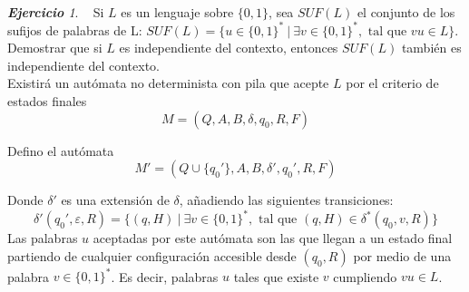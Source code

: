 \documentclass[12pt,spanish]{article}
\theoremstyle{definition}
\theoremstyle{remark}
\newtheorem{exercise}{\textbf{Ejercicio}}%
\begin{document}
~

\begin{exercise}~ Si $L$ es un lenguaje sobre $\{0,1\}$, sea $SUF(L)$
  el conjunto de los sufijos de palabras de L:
  $SUF(L)=\{u\in\{0,1\}^*\ |\ \exists v \in \{0,1\}^*, \text{ tal que
  } vu \in L\}$. Demostrar que si $L$ es independiente del contexto,
  entonces $SUF(L)$ también es independiente del contexto. \\

  Existirá un autómata no determinista con pila que acepte $L$ por
  el criterio de estados finales
  \[M=(Q, A, B, \delta, q_0, R, F)\]

  Defino el autómata
  \[M'=(Q\cup\{q_0'\}, A, B, \delta', q_0', R, F)\]
  
  Donde $\delta'$ es una extensión de $\delta$, añadiendo las
  siguientes transiciones:
  \[\delta'(q_0', \varepsilon, R)=\{(q, H)\ |\ \exists v \in
    \{0,1\}^*, \text{ tal que } (q, H) \in \delta^*(q_0, v, R)\}\] Las
  palabras $u$ aceptadas por este autómata son las que llegan a un
  estado final partiendo de cualquier configuración accesible desde
  $(q_0, R)$ por medio de una palabra $v\in\{0,1\}^*$. Es decir,
  palabras $u$ tales que existe $v$ cumpliendo $vu\in L$.
\end{exercise}
\end{document}
